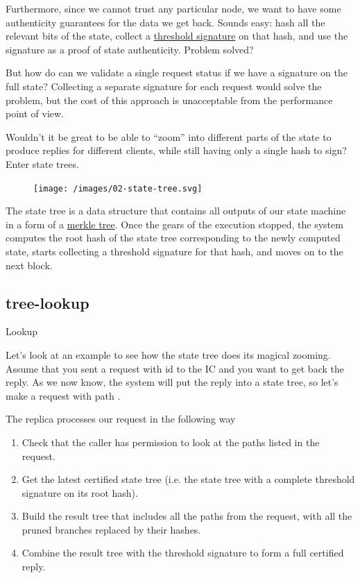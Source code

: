 \documentclass{article}
\begin{document}
Furthermore, since we cannot trust any particular node, we want to have some authenticity guarantees for the data we get back.
Sounds easy: hash all the relevant bits of the state, collect a \href{https://en.wikipedia.org/wiki/Threshold_cryptosystem}{threshold signature} on that hash, and use the signature as a proof of state authenticity.
Problem solved?

But how do can we validate a single request status if we have a signature on the full state?
Collecting a separate signature for each request would solve the problem, but the cost of this approach is unacceptable from the performance point of view.

Wouldn't it be great to be able to ``zoom'' into different parts of the state to produce replies for different clients, while still having only a single hash to sign?
Enter state trees.

\begin{figure}[grayscale-diagram]
\texttt{[image: /images/02-state-tree.svg]}
\end{figure}

The state tree is a data structure that contains all outputs of our state machine in a form of a \href{https://en.wikipedia.org/wiki/Merkle_tree}{merkle tree}.
Once the gears of the execution stopped, the system computes the root hash of the state tree corresponding to the newly computed state, starts collecting a threshold signature for that hash, and moves on to the next block.

\subsection{tree-lookup}{Lookup}

Let's look at an example to see how the state tree does its magical zooming.
Assume that you sent a request with id  to the IC and you want to get back the reply.
As we now know, the system will put the reply into a state tree, so let's make a \href{https://smartcontracts.org/docs/interface-spec/index.html#http-read-state}{} request with path .

The replica processes our request in the following way
\begin{enumerate}
  \item Check that the caller has permission to look at the paths listed in the  request.
  \item Get the latest certified state tree (i.e. the state tree with a complete threshold signature on its root hash).
  \item Build the result tree that includes all the paths from the  request, with all the pruned branches replaced by their hashes.
  \item Combine the result tree with the threshold signature to form a full certified reply.
\end{enumerate}
\end{document}
